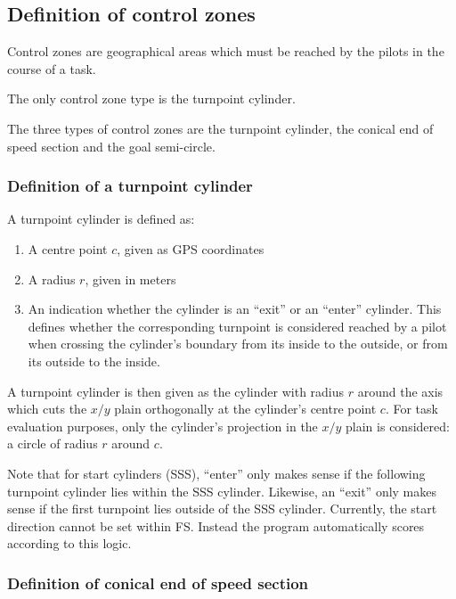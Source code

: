\documentclass{article}
\begin{document}
\subsection{Definition of control zones}
Control zones are geographical areas which must be reached by the pilots in the
course of a task.

\begin{hg}
The only control zone type is the turnpoint cylinder.
\end{hg}

\begin{pg}
The three types of control zones are the turnpoint cylinder, the conical end of
speed section and the goal semi-circle.
\end{pg}

\subsubsection{Definition of a turnpoint cylinder}
A turnpoint cylinder is defined as:
\begin{enumerate}
    \item A centre point \(c\), given as GPS coordinates
    \item A radius \(r\), given in meters
    \item
        An indication whether the cylinder is an “exit” or an “enter” cylinder.
        This defines whether the corresponding turnpoint is considered reached
        by a pilot when crossing the cylinder’s boundary from its inside to the
        outside, or from its outside to the inside.
\end{enumerate}

A turnpoint cylinder is then given as the cylinder with radius \(r\) around the
axis which cuts the \(x/y\) plain orthogonally at the cylinder’s centre point
\(c\).  For task evaluation purposes, only the cylinder’s projection in the
\(x/y\) plain is considered: a circle of radius \(r\) around \(c\).

Note that for start cylinders (SSS), “enter” only makes sense if the following
turnpoint cylinder lies within the SSS cylinder. Likewise, an “exit” only makes
sense if the first turnpoint lies outside of the SSS cylinder. Currently, the
start direction cannot be set within FS. Instead the program automatically
scores according to this logic.

\subsubsection{Definition of conical end of speed section}
\label{sec:define-CESS}
\end{document}
